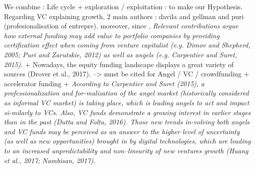 \begin{itemize}
We combine : Life cycle + exploration / exploitation : to make our Hypothesis.
Regarding VC explaining growth, 2 main authors : davila and gellman and puri (profesionalisation of entrepre). moreover, since \citet{cavallo2019fostering}, \textit{Relevant contributions argue how external funding may add value to portfolio companies by providing certification effect when coming from venture capitalist (e.g. Dimov and Shepherd, 2005; Puri and Zarutskie, 2012) as well as angels (e.g. Carpentier and Suret, 2015).} + Nowadays, the equity funding landscape displays a great variety of sources (Drover et al., 2017). --> must be cited for Angel / VC / crowdfunding + accelerator funding + \textit{According to Carpentier and Suret (2015), a professionalization and for-malization of the angel market (historically considered as informal VC market) is taking place, which is leading angels to act and impact si-milarly to VCs. Also, VC funds demonstrate a growing interest in earlier stages than in the past (Dutta and Folta, 2016). Those new trends in-volving both angels and VC funds may be perceived as an answer to the higher level of uncertainty (as well as new opportunities) brought in by digital technologies, which are leading to an increased unpredictability and non–linearity of new ventures growth (Huang et al., 2017; Nambisan, 2017).}


\end{itemize}
